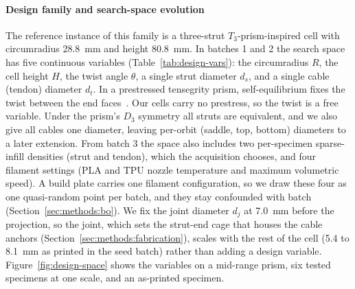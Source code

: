 \documentclass[11pt]{article}
\begin{document}
\paragraph{Design family and search-space evolution} The reference
instance of this family is a three-strut $T_3$-prism-inspired cell with
circumradius \SI{28.8}{mm} and height \SI{80.8}{mm}. In batches 1 and 2
the search space has five continuous variables
(Table~\ref{tab:design-vars}): the circumradius $R$, the cell height
$H$, the twist angle $\theta$, a single strut diameter $d_s$, and a
single cable (tendon) diameter $d_t$. In a prestressed tensegrity prism,
self-equilibrium fixes the twist between the end
faces~\citep{cao2024tensegrityprism}. Our cells carry no prestress, so
the twist is a free variable. Under the prism's $D_3$ symmetry
all struts are equivalent, and we also give all cables one diameter,
leaving per-orbit (saddle, top, bottom) diameters to a later
extension. From batch 3 the space also
includes two per-specimen sparse-infill densities (strut and tendon),
which the acquisition chooses, and four filament settings (PLA and TPU
nozzle temperature and maximum volumetric speed). A build plate carries
one filament configuration, so we draw these four as one quasi-random
point per batch, and they stay confounded with batch
(Section~\ref{sec:methods:bo}). We fix the joint diameter $d_j$ at
\SI{7.0}{mm} before the projection, so the joint, which sets the
strut-end cage that houses the cable anchors
(Section~\ref{sec:methods:fabrication}), scales with the rest of the cell
(5.4 to \SI{8.1}{mm} as printed in the seed batch) rather than adding a
design variable. Figure~\ref{fig:design-space} shows the variables
on a mid-range prism, six tested specimens at one scale, and an
as-printed specimen.
\end{document}
